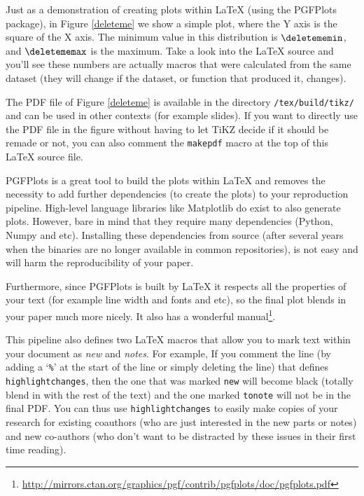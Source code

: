 \documentclass[10pt, twocolumn]{article}
\begin{document}
Just as a demonstration of creating plots within \LaTeX{} (using the
{\small PGFP}lots package), in Figure \ref{deleteme} we show a simple
plot, where the Y axis is the square of the X axis. The minimum value
in this distribution is $\deletememin$, and $\deletememax$ is the
maximum. Take a look into the \LaTeX{} source and you'll see these
numbers are actually macros that were calculated from the same dataset
(they will change if the dataset, or function that produced it,
changes).

The {\small PDF} file of Figure \ref{deleteme} is available in the
directory \texttt{\bdir/tex/build/tikz/} and can be used in other contexts
(for example slides). If you want to directly use the {\small PDF} file in
the figure without having to let {\small T}i{\small KZ} decide if it should
be remade or not, you can also comment the \texttt{makepdf} macro at the
top of this \LaTeX{} source file.

{\small PGFP}lots is a great tool to build the plots within \LaTeX{} and
removes the necessity to add further dependencies (to create the plots) to
your reproduction pipeline. High-level language libraries like Matplotlib
do exist to also generate plots. However, bare in mind that they require
many dependencies (Python, Numpy and etc). Installing these dependencies
from source (after several years when the binaries are no longer available
in common repositories), is not easy and will harm the reproducibility of
your paper.

\begin{figure}[t]

\end{figure}

Furthermore, since {\small PGFP}lots is built by \LaTeX{} it respects all
the properties of your text (for example line width and fonts and etc), so
the final plot blends in your paper much more nicely. It also has a
wonderful
manual\footnote{\url{http://mirrors.ctan.org/graphics/pgf/contrib/pgfplots/doc/pgfplots.pdf}}.

This pipeline also defines two \LaTeX{} macros that allow you to mark text
within your document as \emph{new} and \emph{notes}. For example,   If you comment the line (by adding a `\texttt{\%}'
at the start of the line or simply deleting the line) that defines
\texttt{highlightchanges}, then the one that was marked \texttt{new} will
become black (totally blend in with the rest of the text) and the one
marked \texttt{tonote} will not be in the final PDF. You can thus use
\texttt{highlightchanges} to easily make copies of your research for
existing coauthors (who are just interested in the new parts or notes) and
new co-authors (who don't want to be distracted by these issues in their
first time reading).
\end{document}
